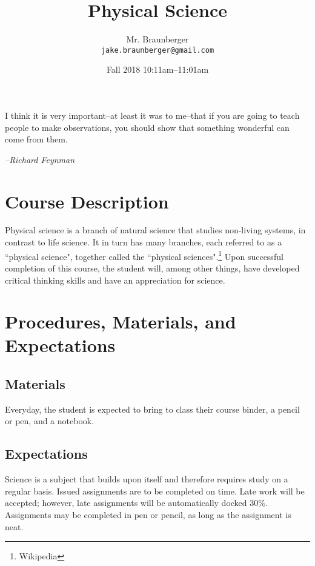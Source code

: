 \documentclass[11pt,article,oneside]{memoir}
\begin{document}
\title{\LARGE Physical Science}
\author{\Large Mr. Braunberger \newline \\ \footnotesize\texttt{\noindent jake.braunberger@gmail.com}}
\date{\hspace*{2.3cm}Fall 2018 \newline \noindent \hspace*{-1.4cm} 10:11am--11:01am}

\setlength{\epigraphwidth}{.8\textwidth}

\maketitle

\epigraph{I think it is very important--at least it was to me--that if you are going to teach people to make observations, you should show that something wonderful can come from them.}{\textit{--Richard Feynman}}




\section*{Course Description}
Physical science is a branch of natural science that studies non-living systems, in contrast to life science. It in turn has many branches, each referred to as a ``physical science", together called the ``physical sciences".\footnote{Wikipedia} Upon successful completion
 of this course, the student will, among other things, have
developed critical thinking skills and have an appreciation for science.


\section*{Procedures, Materials, and Expectations}
\subsection*{Materials}
	Everyday, the student is expected to bring to class their course binder, a pencil or pen, and a notebook. 
\subsection*{Expectations}
	Science is a subject that builds upon itself and therefore requires study on a regular basis.
	Issued assignments are to be completed on time. Late work will be accepted; however,
late assignments will be automatically docked 30\%. Assignments may be completed in pen or pencil, as long as the assignment is neat.
\end{document}
